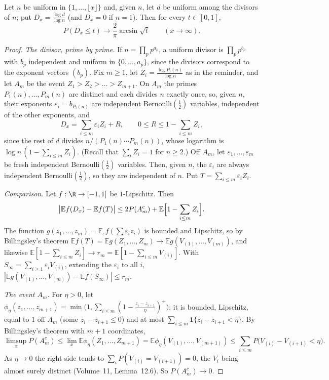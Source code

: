 \begin{theorem}\label{thm:ddt}
Let $n$ be uniform in $\{1,\dots,\lfloor x\rfloor\}$ and, given $n$, let $d$ be uniform among the divisors of $n$; put $D_x=\frac{\log d}{\log n}$ (and $D_x=0$ if $n=1$). Then for every $t\in[0,1]$,
\[
P(D_x\le t)\longrightarrow\frac2\pi\arcsin\sqrt t\qquad(x\to\infty).
\]
\end{theorem}
\begin{proof}
\emph{The divisor, prime by prime.} If $n=\prod_pp^{a_p}$, a uniform divisor is $\prod_pp^{b_p}$ with $b_p$ independent and uniform in $\{0,\dots,a_p\}$, since the divisors correspond to the exponent vectors $(b_p)$. Fix $m\ge1$, let $Z_i=\frac{\log P_i(n)}{\log n}$ as in the reminder, and let $A_m$ be the event $Z_1>Z_2>\dots>Z_{m+1}$. On $A_m$ the primes $P_1(n),\dots,P_m(n)$ are distinct and each divides $n$ exactly once, so, given $n$, their exponents $\varepsilon_i=b_{P_i(n)}$ are independent Bernoulli$(\frac12)$ variables, independent of the other exponents, and
\[
D_x=\sum_{i\le m}\varepsilon_iZ_i+R,\qquad0\le R\le1-\sum_{i\le m}Z_i,
\]
since the rest of $d$ divides $n/(P_1(n)\cdots P_m(n))$, whose logarithm is $\log n\,(1-\sum_{i\le m}Z_i)$. (Recall that $\sum_iZ_i=1$ for $n\ge2$.) Off $A_m$, let $\varepsilon_1,\dots,\varepsilon_m$ be fresh independent Bernoulli$(\frac12)$ variables. Then, given $n$, the $\varepsilon_i$ are always independent Bernoulli$(\frac12)$, so they are independent of $n$. Put $T=\sum_{i\le m}\varepsilon_iZ_i$.

\emph{Comparison.} Let $f:\R\to[-1,1]$ be $1$-Lipschitz. Then
\[
\bigl|\mathbb Ef(D_x)-\mathbb Ef(T)\bigr|\le2P(A_m^c)+\mathbb E\Bigl[1-\sum_{i\le m}Z_i\Bigr].
\]
The function $g(z_1,\dots,z_m)=\mathbb E_\varepsilon f(\sum\varepsilon_iz_i)$ is bounded and Lipschitz, so by Billingsley's theorem $\mathbb Ef(T)=\mathbb Eg(Z_1,\dots,Z_m)\to\mathbb Eg(V_{(1)},\dots,V_{(m)})$, and likewise $\mathbb E[1-\sum_{i\le m}Z_i]\to r_m=\mathbb E[1-\sum_{i\le m}V_{(i)}]$. With $S_\infty=\sum_{i\ge1}\varepsilon_iV_{(i)}$, extending the $\varepsilon_i$ to all $i$, $|\mathbb Eg(V_{(1)},\dots,V_{(m)})-\mathbb Ef(S_\infty)|\le r_m$.

\emph{The event $A_m$.} For $\eta>0$, let $\phi_\eta(z_1,\dots,z_{m+1})=\min\bigl(1,\sum_{i\le m}(1-\frac{z_i-z_{i+1}}\eta)^+\bigr)$: it is bounded, Lipschitz, equal to $1$ off $A_m$ (some $z_i-z_{i+1}\le0$) and at most $\sum_{i\le m}\mathbf 1\{z_i-z_{i+1}<\eta\}$. By Billingsley's theorem with $m+1$ coordinates,
\[
\limsup_xP(A_m^c)\le\lim_x\mathbb E\phi_\eta(Z_1,\dots,Z_{m+1})=\mathbb E\phi_\eta(V_{(1)},\dots,V_{(m+1)})\le\sum_{i\le m}P\bigl(V_{(i)}-V_{(i+1)}<\eta\bigr).
\]
As $\eta\to0$ the right side tends to $\sum_iP(V_{(i)}=V_{(i+1)})=0$, the $V_i$ being almost surely distinct (Volume~11, Lemma~12.6). So $P(A_m^c)\to0$.


\end{proof}
